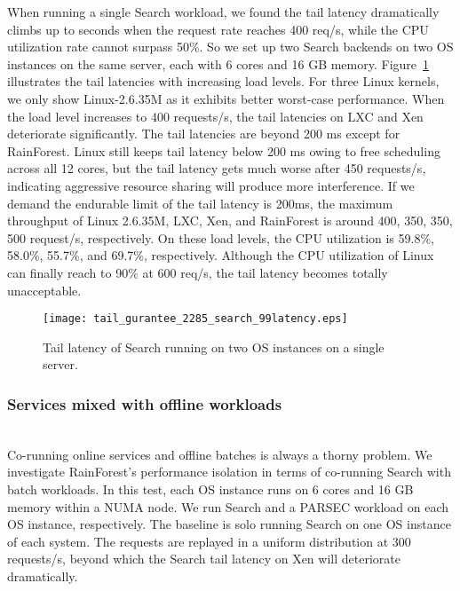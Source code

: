 \documentclass[pageno]{jpaper}
\begin{document}
When running a single Search workload, we found the tail latency dramatically climbs up to seconds when the request rate reaches 400 req/s, while the CPU utilization rate cannot surpass 50\%. So we set up two Search backends on two OS instances on the same server, each with 6 cores and 16 GB memory. Figure~\ref{tail_latency_gurantee_search_99latency} illustrates the tail latencies with increasing load levels. For three Linux kernels, we only show Linux-2.6.35M as it exhibits better worst-case performance. When the load level increases to 400 requests/s, the tail latencies on LXC and Xen deteriorate significantly. The tail latencies are beyond 200 ms except for RainForest. Linux  still keeps tail latency below 200 ms owing to free scheduling across all 12 cores, but the tail latency gets much worse after 450 requests/s, indicating  aggressive resource sharing will  produce more interference. If we demand the endurable limit of the tail latency is 200ms, the maximum throughput of Linux 2.6.35M, LXC, Xen, and RainForest is around  400, 350, 350, 500 request/s, respectively. On these load levels, the CPU utilization is 59.8\%, 58.0\%, 55.7\%, and 69.7\%, respectively. Although the CPU utilization of Linux can finally reach to 90\% at 600 req/s, the tail latency becomes totally unacceptable.









\begin{figure}[t]
\setlength{\abovecaptionskip}{3pt}
\setlength{\belowcaptionskip}{0pt}
  \centering
  \texttt{[image: tail\_gurantee\_2285\_search\_99latency.eps]}
  \caption{Tail latency  of Search running on two OS instances on a single server.}
  \label{tail_latency_gurantee_search_99latency}
\end{figure}


\subsubsection{Services mixed with offline workloads}\label{mixed_search_parsec_static}
\textrm{\\} Co-running online services and offline batches is always a thorny problem.
We investigate RainForest's performance isolation in terms of co-running Search with batch workloads. In this test, each OS instance runs on 6 cores and 16 GB memory within a NUMA node. We run Search and a PARSEC workload on each OS instance, respectively. The baseline is solo running Search on one OS instance of each system. The requests are replayed in a uniform distribution at 300 requests/s, beyond which the Search tail latency on  Xen will deteriorate dramatically.
\end{document}
